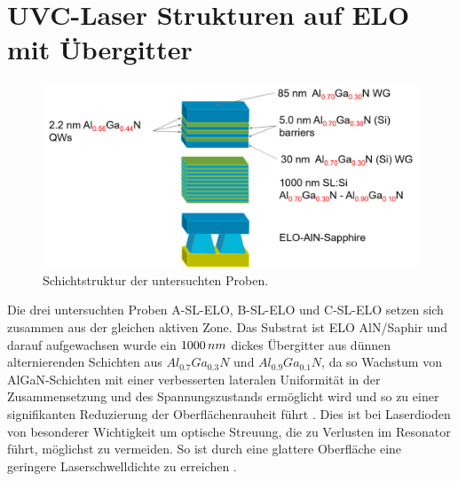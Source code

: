 \section{UVC-Laser Strukturen auf ELO mit Übergitter}
\begin{figure}[h]
\includegraphics[width=\linewidth]{Bilder/TS4048/ts4048.png}
\caption{Schichtstruktur der untersuchten Proben.}
\label{fig:schichtenelo}
\end{figure}
\noindent 
Die drei untersuchten Proben A-SL-ELO, B-SL-ELO und C-SL-ELO setzen sich zusammen aus der gleichen aktiven Zone. Das Substrat ist ELO AlN/Saphir und darauf aufgewachsen wurde ein $1000 \thinspace nm$ dickes Übergitter aus dünnen alternierenden Schichten aus $ Al_{0.7}Ga_{0.3}N$ und $ Al_{0.9}Ga_{0.1}N$, da so Wachstum von AlGaN-Schichten mit einer verbesserten lateralen Uniformität in der Zusammensetzung und des Spannungszustands ermöglicht wird und so zu einer signifikanten Reduzierung der Oberflächenrauheit führt \cite{doi:10.1002/pssa.201800005} \cite{tino}. Dies ist bei Laserdioden von besonderer Wichtigkeit um optische Streuung, die zu Verlusten im Resonator führt, möglichst zu vermeiden. So ist durch eine glattere Oberfläche eine geringere Laserschwelldichte zu erreichen \cite{doi:10.1002/pssa.201870032}.
%

